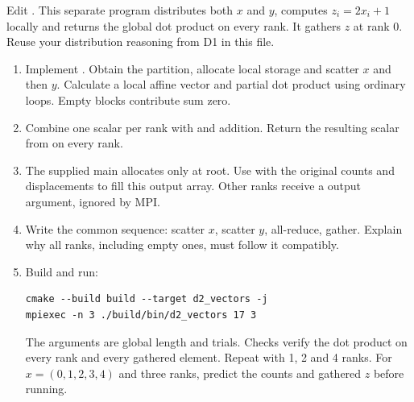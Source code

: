 Edit . This separate program distributes both $x$ and $y$,
computes $z_i=2x_i+1$ locally and returns the global dot product on every rank.
It gathers $z$ at rank 0. Reuse your distribution reasoning from D1 in this file.
\begin{enumerate}
\item Implement . Obtain the partition, allocate
local storage and scatter $x$ and then $y$. Calculate a local affine vector and
partial dot product using ordinary loops. Empty blocks contribute sum zero.
\item Combine one scalar per rank with  and addition.
Return the resulting scalar from  on every rank.
\item The supplied main allocates  only at root. Use
 with the original counts and displacements to fill this
output array. Other ranks receive a  output argument, ignored by MPI.
\item Write the common sequence: scatter $x$, scatter $y$, all-reduce, gather.
Explain why all ranks, including empty ones, must follow it compatibly.
\item Build and run:
\begin{lstlisting}[style=shell]
cmake --build build --target d2_vectors -j
mpiexec -n 3 ./build/bin/d2_vectors 17 3
\end{lstlisting}
The arguments are global length and trials. Checks verify the dot product on
every rank and every gathered element. Repeat with 1, 2 and 4 ranks. For
$x=(0,1,2,3,4)$ and three ranks, predict the counts and gathered $z$ before running.
\end{enumerate}

